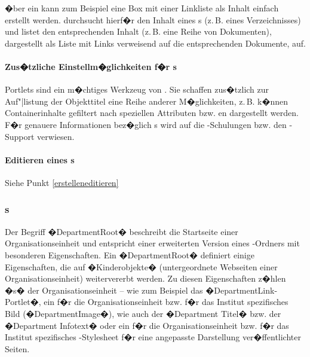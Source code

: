 \begin{Hinweis}
  �ber ein  kann zum Beispiel eine Box mit einer
  Linkliste als Inhalt einfach erstellt werden. 
  durchsucht hierf�r den Inhalt eines s (z.\,B.
  eines Verzeichnisses) und listet den entsprechenden Inhalt (z.\,B.
  eine Reihe von Dokumenten), dargestellt als Liste mit Links
  verweisend auf die entsprechenden Dokumente, auf.
\end{Hinweis}


\paragraph{Zus�tzliche Einstellm�glichkeiten f�r s}
Portlets sind ein m�chtiges Werkzeug von . Sie schaffen zus�tzlich zur
Auf"|listung der Objekttitel eine Reihe anderer M�glichkeiten, z.\,B. k�nnen
Containerinhalte gefiltert nach speziellen Attributen bzw. en dargestellt
werden. F�r genauere Informationen bez�glich s wird auf die -Schulungen
bzw. den -Support verwiesen.

\paragraph{Editieren eines s}
Siehe Punkt \ref{erstelleneditieren}

\subsubsection{s}
\label{departmentroots}
Der Begriff �DepartmentRoot� beschreibt die Startseite einer Organisationseinheit
und entspricht einer erweiterten Version eines -Ordners mit besonderen
Eigenschaften. Ein �DepartmentRoot� definiert einige Eigenschaften, die auf
�Kinderobjekte� (untergeordnete Webseiten einer Organisationseinheit) weitervererbt
werden. Zu diesen Eigenschaften z�hlen �s� der Organisationseinheit -- wie
zum Beispiel das �DepartmentLink-Portlet�, ein f�r die Organisationseinheit bzw. f�r
das Institut spezifisches Bild (�DepartmentImage�), wie auch der �Department Titel�
bzw. der �Department Infotext� oder ein f�r die Organisationseinheit bzw. f�r das
Institut spezifisches -Stylesheet f�r eine angepasste Darstellung
ver�ffentlichter Seiten.


